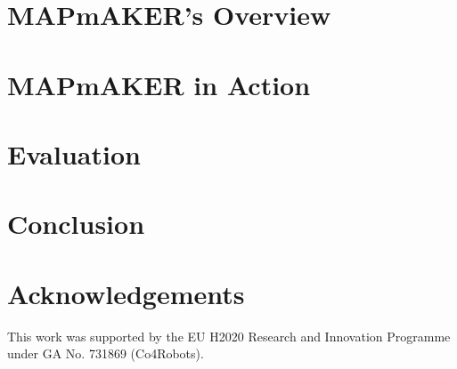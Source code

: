 \documentclass[10pt,conference]{IEEEtran}
\begin{document}
	\section{MAPmAKER's Overview}
	\label{sec:approach}
	
	
	\section{MAPmAKER in Action}
	\label{sec:tool}
	
	
	
	\section{Evaluation}
	\label{sec:evaluation}
	
	
	
	\section{Conclusion}
	\label{sec:conclusion}
	

\section*{Acknowledgements}
This work was supported by the EU H2020 Research and Innovation Programme under GA No. 731869 (Co4Robots).

	\balance
	
	
	
\end{document}
